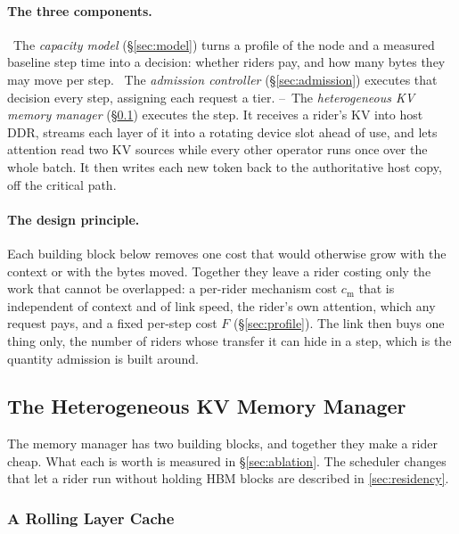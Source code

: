 \paragraph{The three components.} ~The \emph{capacity model}
(\S\ref{sec:model}) turns a profile of the node and a measured baseline step time
into a decision: whether riders pay, and how many bytes they may move per step.
~The \emph{admission controller} (\S\ref{sec:admission}) executes that
decision every step, assigning each request a tier.
--~The \emph{heterogeneous KV memory manager} (\S\ref{sec:mm})
executes the step. It receives a rider's KV into host DDR, streams each layer of
it into a rotating device slot ahead of use, and lets attention read two KV
sources while every other operator runs once over the whole batch. It then
writes each new token back to the authoritative host copy, off the critical path.

\paragraph{The design principle.} Each building block below removes one cost
that would otherwise grow with the context or with the bytes moved. Together they
leave a rider costing only the work that cannot be overlapped: a per-rider
mechanism cost $c_{\mathrm{m}}$ that is independent of context and of link
speed, the rider's own attention, which any request pays, and a fixed per-step
cost $F$ (\S\ref{sec:profile}). The link then buys one thing only, the number of
riders whose transfer it can hide in a step, which is the quantity admission is
built around.

\subsection{The Heterogeneous KV Memory Manager}\label{sec:mm}

The memory manager has two building blocks, and together they make a rider
cheap. What each is worth is measured in \S\ref{sec:ablation}. The scheduler changes
that let a rider run without holding HBM blocks are described in
\cref{sec:residency}.

\subsubsection{A Rolling Layer Cache}\label{sec:rolling}

